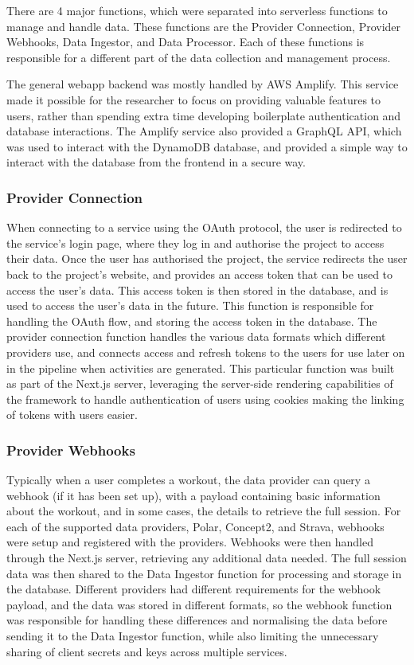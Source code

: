 There are 4 major functions, which were separated into serverless functions to manage and handle data. These functions are the Provider Connection, Provider Webhooks, Data Ingestor, and Data Processor. Each of these functions is responsible for a different part of the data collection and management process.

The general webapp backend was mostly handled by AWS Amplify. This service made it possible for the researcher to focus on providing valuable features to users, rather than spending extra time developing boilerplate authentication and database interactions. The Amplify service also provided a GraphQL API, which was used to interact with the DynamoDB database, and provided a simple way to interact with the database from the frontend in a secure way.

\subsubsection{Provider Connection}
When connecting to a service using the OAuth protocol, the user is redirected to the service's login page, where they log in and authorise the project to access their data. Once the user has authorised the project, the service redirects the user back to the project's website, and provides an access token that can be used to access the user's data. This access token is then stored in the database, and is used to access the user's data in the future. This function is responsible for handling the OAuth flow, and storing the access token in the database. The provider connection function handles the various data formats which different providers use, and connects access and refresh tokens to the users for use later on in the pipeline when activities are generated. This particular function was built as part of the Next.js server, leveraging the server-side rendering capabilities of the framework to handle authentication of users using cookies making the linking of tokens with users easier.

\subsubsection{Provider Webhooks}
Typically when a user completes a workout, the data provider can query a webhook (if it has been set up), with a payload containing basic information about the workout, and in some cases, the details to retrieve the full session. For each of the supported data providers, Polar, Concept2, and Strava, webhooks were setup and registered with the providers. Webhooks were then handled through the Next.js server, retrieving any additional data needed. The full session data was then shared to the Data Ingestor function for processing and storage in the database. Different providers had different requirements for the webhook payload, and the data was stored in different formats, so the webhook function was responsible for handling these differences and normalising the data before sending it to the Data Ingestor function, while also limiting the unnecessary sharing of client secrets and keys across multiple services.

